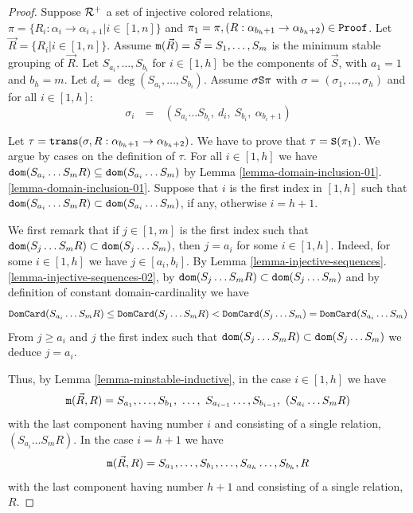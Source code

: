 \documentclass{lmcs}
\begin{document}
\begin{proof}
Suppose ${\mathcal R}^+$ a set of injective colored relations, 
$\pi = \{R_i:\alpha_i \rightarrow \alpha_{i+1}| i \in [1,n]\}$ and 
$\pi_1 = \pi, (R:\alpha_{b_h+1} \rightarrow \alpha_{b_h+2}) \in {\tt Proof}$.
Let $\vec{R}= \{R_i | i \in [1,n]\}$.  
Assume ${\tt m}(\vec{R}) = \vec{S} = S_1, \ldots, S_m$ is the minimum stable grouping
of $\vec{R}$. Let $S_{a_i}, \ldots, S_{b_i}$ for $i \in [1,h]$ be the components of $\vec{S}$,
with $a_1=1$ and $b_h=m$. Let $d_i = \deg(S_{a_i}, \ldots, S_{b_i})$.
Assume $\sigma {\tt S} \pi$ with $\sigma = (\sigma_1, \ldots, \sigma_h)$ and for all $i \in [1,h]$:
$$
\sigma_i
\ \ \ = \ \ \ 
(S_{a_i} \ldots S_{b_i}, \ d_i, \ S_{b_i}, \ \alpha_{b_i+1})
$$ 

Let $\tau = {\tt trans}(\sigma,R:\alpha_{b_h+1} \rightarrow \alpha_{b_h+2}) $.
We have to prove that $\tau = {\tt S}(\pi_1)$. We argue by cases on the definition of $\tau$. 
For all $i \in [1,h]$ we have 
${\tt dom}(S_{a_i} \ldots S_m  R) \subseteq {\tt dom}(S_{a_i} \ldots S_m )$ 
by Lemma \ref{lemma-domain-inclusion-01}.\ref{lemma-domain-inclusion-01}.
Suppose that $i$ is the first index in $[1,h]$ such that 
${\tt dom}(S_{a_i} \ldots S_m  R) \subset {\tt dom}(S_{a_i} \ldots S_m )$, if any, otherwise $i=h+1$.

We first remark that if $j \in [1,m]$ is the first index such that
${\tt dom}(S_{j} \ldots S_m  R) \subset {\tt dom}(S_{j} \ldots S_m )$, then $j = a_i$ for some 
$i \in [1,h]$. Indeed, for some $i \in [1,h]$ we have
$j \in [a_i,b_i]$.
By Lemma \ref{lemma-injective-sequences}.\ref{lemma-injective-sequences-02},
by ${\tt dom}(S_{j} \ldots S_m  R) \subset {\tt dom}(S_{j} \ldots S_m )$
and by definition of constant domain-cardinality we have 
$$
{\tt DomCard}(S_{a_i} \ldots S_m  R) \le 
{\tt DomCard}(S_{j} \ldots S_m  R) < 
{\tt DomCard}(S_{j} \ldots S_m ) =
{\tt DomCard}(S_{a_i} \ldots S_m)
$$ 
From $j \ge a_i$ and $j$ the first index such that 
${\tt dom}(S_{j} \ldots S_m  R) \subset {\tt dom}(S_{j} \ldots S_m )$ we deduce $j = a_i$.

Thus, by Lemma \ref{lemma-minstable-inductive}, in the case $i \in [1,h]$ we have 
$$
\minStable(\vec{R},R) = 
S_{a_1}, \ldots, S_{b_1}, \ \ldots, \ S_{a_{i-1}}\ldots, S_{b_{i-1}}, \ (S_{a_i} \ldots S_m  R)
$$
with the last component having number $i$ and consisting of a single relation, 
$(S_{a_i} \ldots S_m  R)$.
In the case $i = h+1$ we have
$$
{\tt m}(\vec{R},R) = 
S_{a_1}, \ldots, S_{b_1}, \ldots, S_{a_{h}}\ldots, S_{b_{h}}, R
$$
with the last component having number $h+1$ and consisting of a single relation, $R$.


\end{proof}
\end{document}
